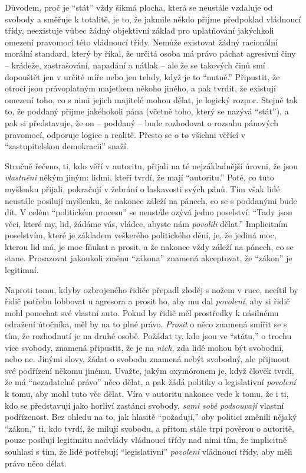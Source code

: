 \documentclass{book}
\begin{document}
Důvodem, proč je \enquote{stát} vždy šikmá plocha, která se neustále vzdaluje od svobody a směřuje k totalitě, je to, že jakmile někdo přijme předpoklad vládnoucí třídy, neexistuje vůbec žádný objektivní základ pro uplatňování jakýchkoli omezení pravomocí této vládnoucí třídy. Nemůže existovat žádný racionální morální standard, který by říkal, že určitá osoba má právo páchat agresivní činy -- krádeže, zastrašování, napadání a nátlak -- ale že se takových činů smí dopouštět jen v určité míře nebo jen tehdy, když je to \enquote{nutné.} Připustit, že otroci jsou právoplatným majetkem někoho jiného, a pak tvrdit, že existují omezení toho, co s nimi jejich majitelé mohou dělat, je logický rozpor. Stejně tak to, že poddaný přijme jakéhokoli pána (včetně toho, který se nazývá \enquote{stát}), a pak si představuje, že on -- poddaný -- bude rozhodovat o rozsahu pánových pravomocí, odporuje logice a realitě. Přesto se o to všichni věřící v \enquote{zastupitelskou demokracii} snaží.

Stručně řečeno, ti, kdo věří v autoritu, přijali na té nejzákladnější úrovni, že jsou \emph{vlastněni} někým jiným: lidmi, kteří tvrdí, že mají \enquote{autoritu.} Poté, co tuto myšlenku přijali, pokračují v žebrání o laskavosti svých pánů. Tím však lidé neustále posilují myšlenku, že nakonec záleží na pánech, co se s poddanými bude dít. V celém \enquote{politickém procesu} se neustále ozývá jedno poselství: \enquote{Tady jsou věci, které my, lid, žádáme vás, vládce, abyste nám \emph{povolili} dělat.} Implicitním poselstvím, které je základem veškerého politického dění, je, že jediná moc, kterou lid má, je moc fňukat a prosit, a že nakonec vždy záleží na pánech, co se stane. Prosazovat jakoukoli změnu \enquote{zákona} znamená akceptovat, že \enquote{zákon} je legitimní.

Naproti tomu, kdyby ozbrojeného řidiče přepadl zloděj s nožem v ruce, necítil by řidič potřebu lobbovat u agresora a prosit ho, aby mu dal \emph{povolení}, aby si řidič mohl ponechat své vlastní auto. Pokud by řidič měl prostředky k násilnému odražení útočníka, měl by na to plné právo. \emph{Prosit} o něco znamená smířit se s tím, že rozhodnutí je na druhé osobě. Požádat ty, kdo jsou ve \enquote{státu,} o trochu více svobody, znamená připustit, že je na \emph{nich}, zda lidé mohou být svobodní, nebo ne. Jinými slovy, žádat o svobodu znamená nebýt svobodný, ale přijmout své podřízení někomu jinému. Uvažte, jakým oxymóronem je, když člověk tvrdí, že má \enquote{nezadatelné právo} něco dělat, a pak žádá politiky o legislativní \emph{povolení} k tomu, aby mohl tuto věc dělat. Víra v autoritu nakonec vede k tomu, že i ti, kdo se představují jako horliví zastánci svobody, \emph{sami sobě podsouvají} vlastní podřízenost. Bez ohledu na to, jak hlasitě \enquote{požadují,} aby politici změnili nějaký \enquote{zákon,} ti, kdo tvrdí, že milují svobodu, a přitom stále trpí pověrou o autoritě, pouze posilují legitimitu nadvlády vládnoucí třídy nad nimi tím, že implicitně souhlasí s tím, že lidé potřebují \enquote{legislativní} \emph{povolení} vládnoucí třídy, aby měli právo něco dělat.
\end{document}

